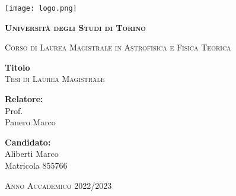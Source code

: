 \thispagestyle{empty}
\begin{center}
    \texttt{[image: logo.png]}
    \vspace{0.5cm}\\
    {\bfseries\scshape\LARGE Università degli Studi di Torino \par}
	\vspace{0,3cm}
	{\scshape\large Corso di Laurea Magistrale in Astrofisica e Fisica Teorica\par}
    \vspace{2cm}
	{\LARGE\bfseries Titolo}
	\vspace{0.3cm}\\
    {\scshape\Large Tesi di Laurea Magistrale}
	\vspace{0,5cm}
\end{center}
\vspace{2cm}
\begin{minipage}[t]{0.4\textwidth} %
    {\large{{\bf Relatore:}\\
        Prof.\\
        Panero Marco}}
\end{minipage}
\hfill
\begin{minipage}[t]{0.47\textwidth}\raggedleft %
    {\large{{\bf Candidato:}\\
        Aliberti Marco\\
        Matricola 855766}}
    \vspace{12mm}
\end{minipage}
\hfill
\vspace{18mm}
\begin{center} %
    \large{\scshape Anno Accademico 2022/2023}
\end{center}
